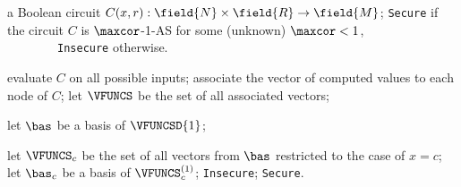 \newcommand\tbX{{c}}

\begin{algorithm}
    
    \begin{algorithmic}[1]
        \Require a Boolean circuit $C(x,r):\field{N}\times\field{R}\to\field{M}$;
        \Ensure \texttt{Secure} if the circuit $C$ is $\maxcor$-1-AS for some (unknown) $\maxcor < 1$,
            \Statex ~~~~~~~~\texttt{Insecure} otherwise.
    
        
        \State evaluate $C$ on all possible inputs;
        \State associate the vector of computed values to each node of $C$;
        \State let $\VFUNCS$ be the set of all associated vectors;
        
        \State let $\bas$ be a basis of $\VFUNCSD{1}$;
        
            \State let $\VFUNCS_c$ be the set of all vectors from $\bas$ restricted to the case of $x = c$;
            \State let $\bas_c$ be a basis of $\VFUNCS_c^{(1)}$;
                \State \Return \texttt{Insecure};
            \EndIf
        \EndFor
        \State \Return \texttt{Secure}.
    \end{algorithmic}
\end{algorithm}